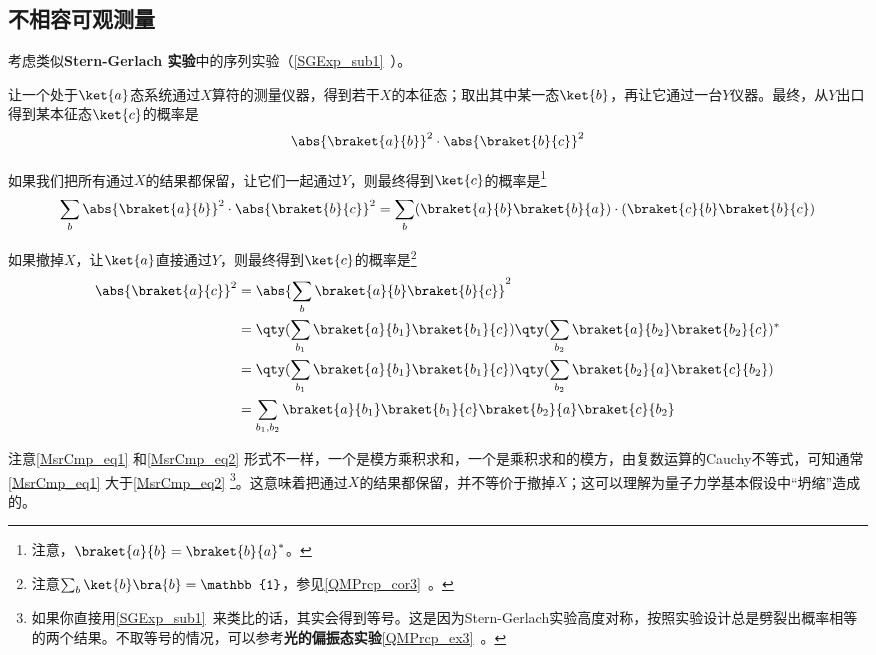 \subsection{不相容可观测量}


考虑类似\textbf{Stern-Gerlach 实验}中的序列实验（\autoref{SGExp_sub1}~）。

让一个处于$\ket{a}$态系统通过$X$算符的测量仪器，得到若干$X$的本征态；取出其中某一态$\ket{b}$，再让它通过一台$Y$仪器。最终，从$Y$出口得到某本征态$\ket{c}$的概率是
\begin{equation}
\abs{\braket{a}{b}}^2\cdot\abs{\braket{b}{c}}^2
\end{equation}

如果我们把所有通过$X$的结果都保留，让它们一起通过$Y$，则最终得到$\ket{c}$的概率是\footnote{注意，$\braket{a}{b}=\braket{b}{a}^*$。}
\begin{equation}\label{MsrCmp_eq1}
\sum_{b}\abs{\braket{a}{b}}^2\cdot\abs{\braket{b}{c}}^2=\sum_{b}(\braket{a}{b}\braket{b}{a})\cdot(\braket{c}{b}\braket{b}{c})
\end{equation}

如果撤掉$X$，让$\ket{a}$直接通过$Y$，则最终得到$\ket{c}$的概率是\footnote{注意$\sum_{b}\ket{b}\bra{b}=\mathbb{1}$，参见\autoref{QMPrcp_cor3}~。}
\begin{equation}\label{MsrCmp_eq2}
\begin{aligned}
\abs{\braket{a}{c}}^2&=\abs{\sum_{b}\braket{a}{b}\braket{b}{c}}^2\\
&=\qty(\sum_{b_1}\braket{a}{b_1}\braket{b_1}{c})\qty(\sum_{b_2}\braket{a}{b_2}\braket{b_2}{c})^*\\
&=\qty(\sum_{b_1}\braket{a}{b_1}\braket{b_1}{c})\qty(\sum_{b_2}\braket{b_2}{a}\braket{c}{b_2})\\
&=\sum_{b_1, b_2}\braket{a}{b_1}\braket{b_1}{c}\braket{b_2}{a}\braket{c}{b_2}
\end{aligned}
\end{equation}

注意\autoref{MsrCmp_eq1} 和\autoref{MsrCmp_eq2} 形式不一样，一个是模方乘积求和，一个是乘积求和的模方，由复数运算的Cauchy不等式，可知通常\autoref{MsrCmp_eq1} 大于\autoref{MsrCmp_eq2} \footnote{如果你直接用\autoref{SGExp_sub1}~来类比的话，其实会得到等号。这是因为Stern-Gerlach实验高度对称，按照实验设计总是劈裂出概率相等的两个结果。不取等号的情况，可以参考\textbf{光的偏振态实验}\autoref{QMPrcp_ex3}~。}。这意味着把通过$X$的结果都保留，并不等价于撤掉$X$；这可以理解为量子力学基本假设中“坍缩”造成的。

